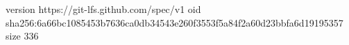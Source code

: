 version https://git-lfs.github.com/spec/v1
oid sha256:6a66bc1085453b7636ca0db34543e260f3553f5a84f2a60d23bbfa6d19195357
size 336
